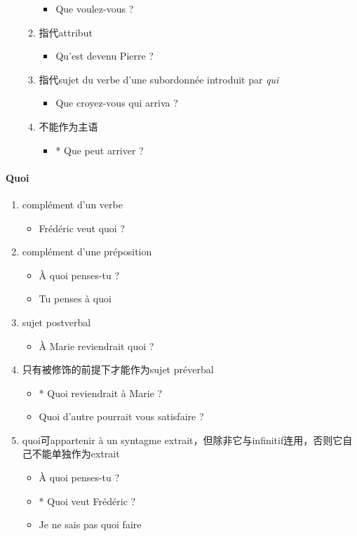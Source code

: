 \documentclass[UTF8]{report}
\begin{document}
\begin{enumerate}
\begin{enumerate}
        \begin{itemize}
            \item Que voulez-vous ?
        \end{itemize}
        \item 指代attribut
        \begin{itemize}
            \item Qu’est devenu Pierre ?
        \end{itemize}
        \item 指代sujet du verbe d’une subordonnée introduit par \textit{qui}
        \begin{itemize}
            \item Que croyez-vous qui arriva ?
        \end{itemize}
        \item 不能作为主语
        \begin{itemize}
            \item * Que peut arriver ?
        \end{itemize}
    \end{enumerate}
\end{enumerate}

\paragraph{Quoi}
\begin{enumerate}
    \item complément d’un verbe
    \begin{itemize}
        \item Frédéric veut quoi ?
    \end{itemize}
    \item complément d’une préposition
    \begin{itemize}
        \item À quoi penses-tu ?
        \item Tu penses à quoi
    \end{itemize}
    \item sujet postverbal
    \begin{itemize}
        \item À Marie reviendrait quoi ?
    \end{itemize}
    \item 只有被修饰的前提下才能作为sujet préverbal
    \begin{itemize}
        \item * Quoi reviendrait à Marie ?
        \item Quoi d’autre pourrait vous satisfaire ?
    \end{itemize}
    \item quoi可appartenir à un syntagme extrait，但除非它与infinitif连用，否则它自己不能单独作为extrait
    \begin{itemize}
        \item À quoi penses-tu ?
        \item * Quoi veut Frédéric ?
        \item Je ne sais pas quoi faire
    \end{itemize}
\end{enumerate}
\end{document}
